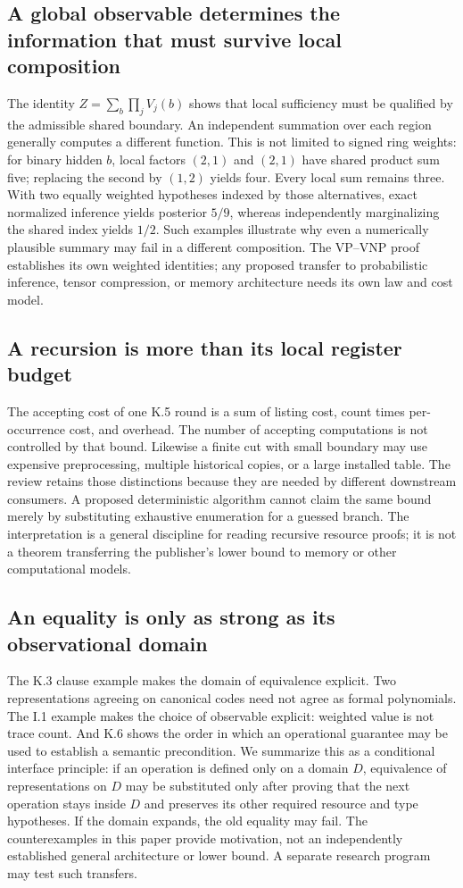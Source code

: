 \documentclass[11pt,letterpaper]{article}
\theoremstyle{definition}\newtheorem{definition}[theorem]{Definition}\newtheorem{example}[theorem]{Example}
\theoremstyle{remark}\newtheorem{remark}[theorem]{Remark}
\begin{document}
\subsection{A global observable determines the information that must survive local composition}
The identity $Z=\sum_b\prod_jV_j(b)$ shows that local sufficiency must be qualified by the admissible shared boundary. An independent summation over each region generally computes a different function. This is not limited to signed ring weights: for binary hidden $b$, local factors $(2,1)$ and $(2,1)$ have shared product sum five; replacing the second by $(1,2)$ yields four. Every local sum remains three. With two equally weighted hypotheses indexed by those alternatives, exact normalized inference yields posterior $5/9$, whereas independently marginalizing the shared index yields $1/2$. Such examples illustrate why even a numerically plausible summary may fail in a different composition. The VP--VNP proof establishes its own weighted identities; any proposed transfer to probabilistic inference, tensor compression, or memory architecture needs its own law and cost model.

\subsection{A recursion is more than its local register budget}
The accepting cost of one K.5 round is a sum of listing cost, count times per-occurrence cost, and overhead. The number of accepting computations is not controlled by that bound. Likewise a finite cut with small boundary may use expensive preprocessing, multiple historical copies, or a large installed table. The review retains those distinctions because they are needed by different downstream consumers. A proposed deterministic algorithm cannot claim the same bound merely by substituting exhaustive enumeration for a guessed branch. The interpretation is a general discipline for reading recursive resource proofs; it is not a theorem transferring the publisher's lower bound to memory or other computational models.

\subsection{An equality is only as strong as its observational domain}
The K.3 clause example makes the domain of equivalence explicit. Two representations agreeing on canonical codes need not agree as formal polynomials. The I.1 example makes the choice of observable explicit: weighted value is not trace count. And K.6 shows the order in which an operational guarantee may be used to establish a semantic precondition. We summarize this as a conditional interface principle: if an operation is defined only on a domain $D$, equivalence of representations on $D$ may be substituted only after proving that the next operation stays inside $D$ and preserves its other required resource and type hypotheses. If the domain expands, the old equality may fail. The counterexamples in this paper provide motivation, not an independently established general architecture or lower bound. A separate research program may test such transfers.
\end{document}

